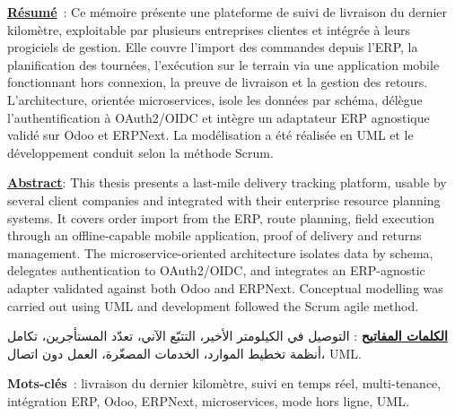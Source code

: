 \vspace{0.15cm}

\noindent\textbf{\underline{Résumé}}~: Ce mémoire présente une plateforme de suivi de livraison du
dernier kilomètre, exploitable par plusieurs entreprises clientes et intégrée à leurs progiciels de
gestion. Elle couvre l'import des commandes depuis l'ERP, la planification des tournées, l'exécution
sur le terrain via une application mobile fonctionnant hors connexion, la preuve de livraison et la
gestion des retours. L'architecture, orientée microservices, isole les données par schéma, délègue
l'authentification à OAuth2/OIDC et intègre un adaptateur ERP agnostique validé sur Odoo et
ERPNext. La modélisation a été réalisée en UML et le développement conduit selon la méthode Scrum.

\vspace{0.15cm}

\noindent\textbf{\underline{Abstract}}: This thesis presents a last-mile delivery tracking platform,
usable by several client companies and integrated with their enterprise resource planning systems.
It covers order import from the ERP, route planning, field execution through an offline-capable
mobile application, proof of delivery and returns management. The microservice-oriented architecture
isolates data by schema, delegates authentication to OAuth2/OIDC, and integrates an ERP-agnostic
adapter validated against both Odoo and ERPNext. Conceptual modelling was carried out using UML and
development followed the Scrum agile method.

\vspace{0.15cm}

\begin{Arabic}
\begin{flushright}
\textbf{\underline{الكلمات المفاتيح}} : التوصيل في الكيلومتر الأخير، التتبّع الآني، تعدّد
المستأجرين، تكامل أنظمة تخطيط الموارد، الخدمات المصغّرة، العمل دون اتصال، UML.
\end{flushright}
\end{Arabic}

\vspace{0.15cm}

\noindent\textbf{Mots-clés}~: livraison du dernier kilomètre, suivi en temps réel, multi-tenance,
intégration ERP, Odoo, ERPNext, microservices, mode hors ligne, UML.

\vspace{0.15cm}

